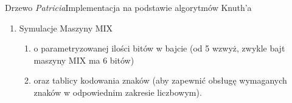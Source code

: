 \documentclass[aspectratio=1610,english]{beamer} %
\begin{document}
\begin{frame}{Drzewo \emph{Patricia}}{Implementacja na podstawie algorytmów Knuth'a}
\begin{enumerate}
\begin{enumerate}
                \item {\color{AGH@green} Symulacje Maszyny MIX}
                \begin{enumerate}
                    \color{gray}
                    \item o parametryzowanej ilości bitów w bajcie \newline
                    \hspace{0.45cm} {\color{lightgray} (od 5 wzwyż, zwykle bajt maszyny MIX ma 6 bitów)}
                    \item oraz tablicy kodowania znaków \newline
                    \hspace{0.45cm} {\color{lightgray} (aby zapewnić obsługę wymaganych znaków w odpowiednim zakresie liczbowym)}.
                \end{enumerate}
            \end{enumerate}
	    \end{enumerate}
	\end{frame}	
\end{document}
